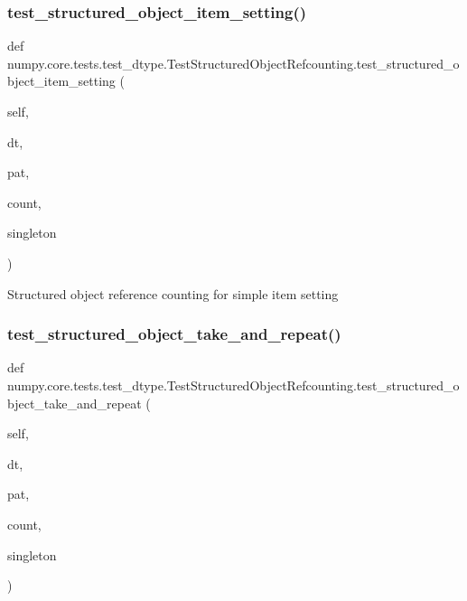 \subsubsection{\texorpdfstring{test\+\_\+structured\+\_\+object\+\_\+item\+\_\+setting()}{test\_structured\_object\_item\_setting()}}
{\footnotesize\ttfamily def numpy.\+core.\+tests.\+test\+\_\+dtype.\+Test\+Structured\+Object\+Refcounting.\+test\+\_\+structured\+\_\+object\+\_\+item\+\_\+setting (\begin{DoxyParamCaption}\item[{}]{self,  }\item[{}]{dt,  }\item[{}]{pat,  }\item[{}]{count,  }\item[{}]{singleton }\end{DoxyParamCaption})}

\begin{DoxyVerb}Structured object reference counting for simple item setting\end{DoxyVerb}
 \mbox{\label{classnumpy_1_1core_1_1tests_1_1test__dtype_1_1TestStructuredObjectRefcounting_aecd47eba12fa495ebefecd8d3adb6f8e}} 
\subsubsection{\texorpdfstring{test\+\_\+structured\+\_\+object\+\_\+take\+\_\+and\+\_\+repeat()}{test\_structured\_object\_take\_and\_repeat()}}
{\footnotesize\ttfamily def numpy.\+core.\+tests.\+test\+\_\+dtype.\+Test\+Structured\+Object\+Refcounting.\+test\+\_\+structured\+\_\+object\+\_\+take\+\_\+and\+\_\+repeat (\begin{DoxyParamCaption}\item[{}]{self,  }\item[{}]{dt,  }\item[{}]{pat,  }\item[{}]{count,  }\item[{}]{singleton }\end{DoxyParamCaption})}

